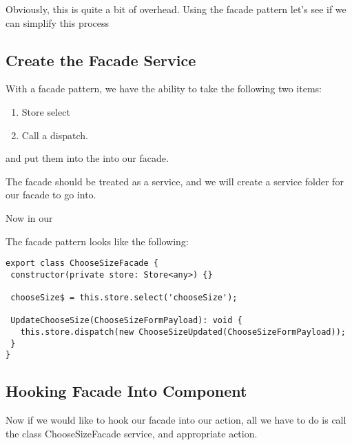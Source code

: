 Obviously, this is quite a bit of overhead. Using the facade pattern let's see
if we can simplify this process

\subsection{ Create the Facade Service  }

With a facade pattern, we have the ability to take the following two items:
\begin{enumerate}
  \item Store select
  \item Call a dispatch.
\end{enumerate}

and put them into the into our facade.

The facade should be treated as a service, and we will create a service folder
for our facade to go into.

Now in our

The facade pattern looks like the following:
\begin{lstlisting}
export class ChooseSizeFacade {
 constructor(private store: Store<any>) {}

 chooseSize$ = this.store.select('chooseSize');

 UpdateChooseSize(ChooseSizeFormPayload): void {
   this.store.dispatch(new ChooseSizeUpdated(ChooseSizeFormPayload));
 }
}
\end{lstlisting}

\subsection{ Hooking Facade Into Component }
Now if we would like to hook our facade into our action, all we have to do is
call the class ChooseSizeFacade service, and appropriate action.

